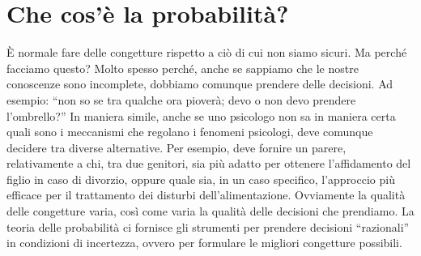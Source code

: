 \chapter{Che cos'è la probabilità?}
\label{chapter:prob_discreta} 

%
%

È normale fare delle congetture rispetto a ciò di cui non siamo sicuri. 
Ma perché facciamo questo? 
Molto spesso perché, anche se sappiamo che le nostre conoscenze sono incomplete, dobbiamo comunque prendere delle decisioni. 
Ad esempio: \enquote{non so se tra qualche ora pioverà; devo o non devo prendere l'ombrello?} 
In maniera simile, anche se uno psicologo non sa in maniera certa quali sono i meccanismi che regolano i fenomeni psicologi, deve comunque decidere tra diverse alternative.
Per esempio, deve fornire un parere, relativamente a chi, tra due genitori, sia più adatto per ottenere l'affidamento del figlio in caso di divorzio, oppure quale sia, in un caso specifico, l'approccio più efficace per il trattamento dei disturbi dell'alimentazione.
Ovviamente la qualità delle congetture varia, così come varia la qualità delle decisioni che prendiamo. 
La teoria delle probabilità ci fornisce gli strumenti per prendere decisioni \enquote{razionali} in condizioni di incertezza, ovvero per formulare le migliori congetture possibili. 

